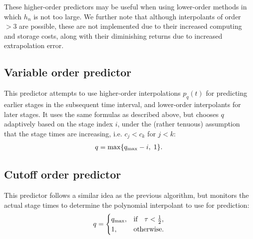 \documentclass[letterpaper,10pt,english]{sphinxmanual}
\begin{document}
These higher-order predictors may be useful when using lower-order
methods in which \(h_n\) is not too large.  We further note that
although interpolants of order \(> 3\) are possible, these are not
implemented due to their increased computing and storage costs, along
with their diminishing returns due to increased extrapolation error.


\subsection{Variable order predictor}
\label{Mathematics:variable-order-predictor}\label{Mathematics:mathematics-predictors-decreasing}
This predictor attempts to use higher-order interpolations
\(p_q(t)\) for predicting earlier stages in the subsequent time
interval, and lower-order interpolants for later stages.  It uses the
same formulas as described above, but chooses \(q\) adaptively
based on the stage index \(i\), under the (rather tenuous)
assumption that the stage times are increasing, i.e. \(c_j < c_k\)
for \(j<k\):
\begin{gather}
\begin{split}q = \max\{ q_\text{max} - i,\; 1 \}.\end{split}\notag
\end{gather}

\subsection{Cutoff order predictor}
\label{Mathematics:cutoff-order-predictor}\label{Mathematics:mathematics-predictors-cutoff}
This predictor follows a similar idea as the previous algorithm, but
monitors the actual stage times to determine the polynomial
interpolant to use for prediction:
\begin{gather}
\begin{split}q = \begin{cases}
   q_\text{max}, & \text{if}\quad \tau < \tfrac12,\\
   1, & \text{otherwise}.
\end{cases}\end{split}\notag
\end{gather}
\end{document}
